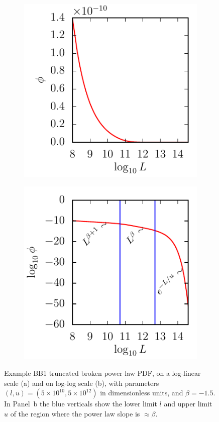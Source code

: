 \begin{figure}
	\begin{subfigure}[c]{0.45\textwidth}
		\includegraphics{fig/lumfunc_loglin}
		\caption{}
	\end{subfigure}
	\begin{subfigure}[c]{0.45\textwidth}
		\includegraphics{fig/lumfunc_loglog}
		\caption{}
	\end{subfigure}
	\caption{Example BB1 truncated broken power law PDF, on a log-linear scale (a) and on log-log scale (b), with parameters $(l,u) = (5\times 10^{10}, 5\times 10^{12})$ in dimensionless units, and $\beta = -1.5$.
	In Panel~b the blue verticals show the lower limit $l$ and upper limit $u$ of the region where the power law slope is $\approx\beta$.}
	\label{fig:lumfunc}
\end{figure}

